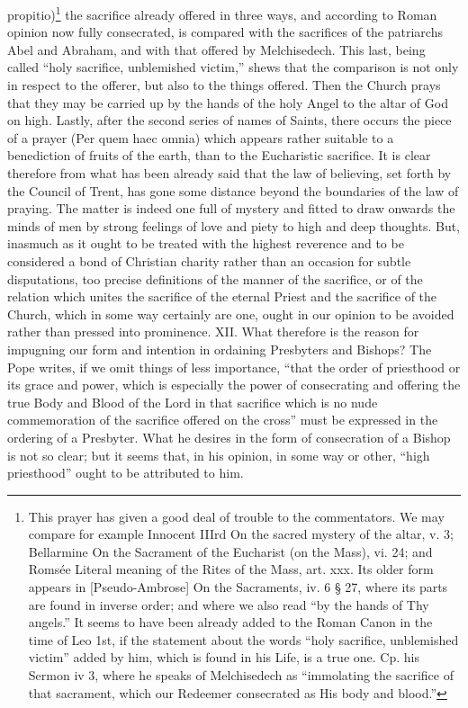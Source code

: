 propitio)\footnote{This prayer has given a good deal of trouble to the commentators. We may compare for example Innocent IIIrd On the sacred mystery of the altar, v. 3; Bellarmine On the Sacrament of the Eucharist (on the Mass), vi. 24; and Romsée Literal meaning of the Rites of the Mass, art. xxx. Its older form appears in [Pseudo-Ambrose] On the Sacraments, iv. 6 § 27, where its parts are found in inverse order; and where we also read “by the hands of Thy angels.” It seems to have been already added to the Roman Canon in the time of Leo 1st, if the statement about the words “holy sacrifice, unblemished victim” added by him, which is found in his Life, is a true one. Cp. his Sermon iv 3, where he speaks of Melchisedech as “immolating the sacrifice of that sacrament, which our Redeemer consecrated as His body and blood.”} the sacrifice already offered in three ways, and according to Roman opinion now fully consecrated, is compared with the sacrifices of the patriarchs Abel and Abraham, and with that offered by Melchisedech. This last, being called “holy sacrifice, unblemished victim,” shews that the comparison is not only in respect to the offerer, but also to the things offered. Then the Church prays that they may be carried up by the hands of the holy Angel to the altar of God on high. Lastly, after the second series of names of Saints, there occurs the piece of a prayer (Per quem haec omnia) which appears rather suitable to a benediction of fruits of the earth, than to the Eucharistic sacrifice. It is clear therefore from what has been already said that the law of believing, set forth by the Council of Trent, has gone some distance beyond the boundaries of the law of praying. The matter is indeed one full of mystery and fitted to draw onwards the minds of men by strong feelings of love and piety to high and deep thoughts. But, inasmuch as it ought to be treated with the highest reverence and to be considered a bond of Christian charity rather than an occasion for subtle disputations, too precise definitions of the manner of the sacrifice, or of the relation which unites the sacrifice of the eternal Priest and the sacrifice of the Church, which in some way certainly are one, ought in our opinion to be avoided rather than pressed into prominence. XII. What therefore is the reason for impugning our form and intention in ordaining Presbyters and Bishops? The Pope writes, if we omit things of less importance, “that the order of priesthood or its grace and power, which is especially the power of consecrating and offering the true Body and Blood of the Lord in that sacrifice which is no nude commemoration of the sacrifice offered on the cross” must be expressed in the ordering of a Presbyter. What he desires in the form of consecration of a Bishop is not so clear; but it seems that, in his opinion, in some way or other, “high priesthood” ought to be attributed to him.

